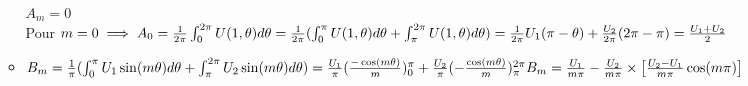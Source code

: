 \documentclass[12pt]{book}
\begin{document}
\begin{itemize}
\begin{itemize}
                          $A_m =0 $ \\
                          Pour $ m=0 \implies A_0=\frac{1}{2\pi}\int^{2\pi}_0U(1,\theta)d\theta = \frac{1}{2\pi}(\int^\pi_0U(1,\theta)d\theta + \int^{2\pi}_\pi U(1,\theta)d\theta)\\
                           = \frac{1}{2\pi}U_1(\pi-\theta)+\frac{U_2}{2\pi}(2\pi-\pi) = \frac{U_1+U_2}{2} $
                    \item $B_m = \frac{1}{\pi}(\int^\pi_0 U_1\sin(m\theta)d\theta + \int_\pi^{2\pi}U_2\sin(m\theta)d\theta) = \frac{U_1}{\pi}(\frac{-\cos(m\theta)}{m})^\pi_0+\frac{U_2}{\pi}(-\frac{\cos(m\theta)}{m})^{2\pi}_\pi \\
                           B_m = \frac{U_1}{m\pi}-\frac{U_2}{m\pi}\times\left[ \frac{U_2-U_1}{m\pi}\cos(m\pi) \right]$
                   \end{itemize}

            \end{itemize}

            
            

            



            
            
            



        
            
\end{document}
